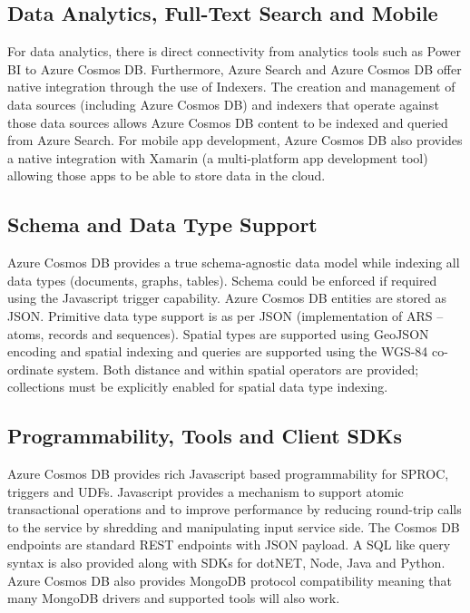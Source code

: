 \subsection{Data Analytics, Full-Text Search and Mobile}
For data analytics, there is direct connectivity from analytics tools
such as Power BI to Azure Cosmos DB. Furthermore, Azure Search and
Azure Cosmos DB offer native integration through the use of
Indexers. The creation and management of data sources (including Azure
Cosmos DB) and indexers that operate against those data sources allows
Azure Cosmos DB content to be indexed and queried from Azure
Search. For mobile app development, Azure Cosmos DB also provides a
native integration with Xamarin (a multi-platform app development
tool) allowing those apps to be able to store data in the cloud.

\subsection{Schema and Data Type Support}
Azure Cosmos DB provides a true schema-agnostic data model while
indexing all data types (documents, graphs, tables). Schema could be
enforced if required using the Javascript trigger capability.  Azure
Cosmos DB entities are stored as JSON. Primitive data type support is
as per JSON (implementation of ARS – atoms, records and
sequences). Spatial types are supported using GeoJSON encoding and
spatial indexing and queries are supported using the WGS-84
co-ordinate system. Both distance and within spatial operators are
provided; collections must be explicitly enabled for spatial data type
indexing.

\subsection{Programmability, Tools and Client SDKs}
Azure Cosmos DB provides rich Javascript based programmability for
SPROC, triggers and UDFs. Javascript provides a mechanism to support
atomic transactional operations and to improve performance by reducing
round-trip calls to the service by shredding and manipulating input
service side.  The Cosmos DB endpoints are standard REST endpoints
with JSON payload. A SQL like query syntax is also provided along with
SDKs for dotNET, Node, Java and Python. Azure Cosmos DB also provides
MongoDB protocol compatibility meaning that many MongoDB drivers and
supported tools will also work.

